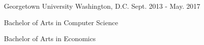 

\begin{cventries}

  \cventry
  {} %
  {Georgetown University} %
  {Washington, D.C.} %
  {Sept. 2013 - May. 2017} %
  {
    \vspace{-10mm}
    \begin{cvitems} %
      \item {Bachelor of Arts in Computer Science}
      \item {Bachelor of Arts in Economics}
    \end{cvitems}
  }
\end{cventries}